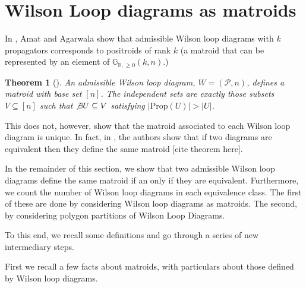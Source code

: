 \documentclass[11pt]{article}
\newcommand{\R}{\mathbb{R}}
\newcommand{\Gr}{\mathbb{G}_{\R, \geq 0}}
\newcommand{\cP}{\mathcal{P}}
\newcommand{\Prop}{\textrm{Prop}}
\newtheorem{thm}{Theorem}[section]
\theoremstyle{remark}
\theoremstyle{definition}
\begin{document}
\section{Wilson Loop diagrams as matroids}

In \cite{wilsonloop}, Amat and Agarwala show that admissible Wilson loop diagrams with $k$ propagators corresponds to positroids of rank $k$ (a matroid that can be represented by an element of $\Gr(k, n)$.)

\begin{thm}[\cite{wilsonloop}] An admissible Wilson loop diagram, $W =(\cP, n)$, defines a matroid with base set $[n]$. The independent sets are exactly those subsets $V \subseteq [n]$ such that $\not \exists U\subseteq V$ satisfying $|\Prop(U)|> |U|$. \label{thm:WLDmatroid}\end{thm}

This does not, however, show that the matroid associated to each Wilson loop diagram is unique. In fact, in \cite{wilsonloop}, the authors show that if two diagrams are equivalent then they define the same matroid [cite theorem here].

In the remainder of this section, we show that two admissible Wilson loop diagrams define the same matroid if an only if they are equivalent. Furthermore, we count the number of Wilson loop diagrams in each equivalence class. The first of these are done by considering Wilson loop diagrams as matroids. The second, by considering polygon partitions of Wilson Loop Diagrams. 

To this end, we recall some definitions and go through a series of new intermediary steps.

First we recall a few facts about matroids, with particulars about those defined by Wilson loop diagrams.
\end{document}
